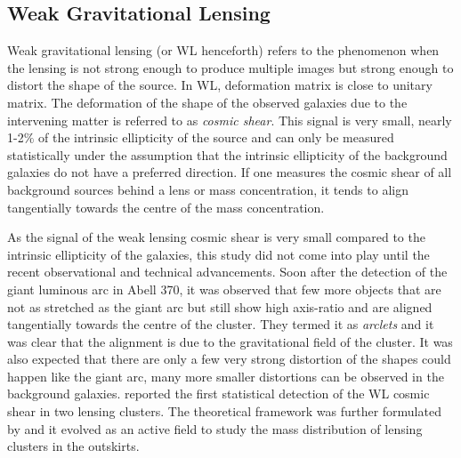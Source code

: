 \subsection{Weak Gravitational Lensing}\label{sec:wl}

Weak gravitational lensing (or WL henceforth) refers to the phenomenon when 
the lensing is not strong enough to produce multiple images but strong enough
to distort the shape of the source. In WL, deformation matrix is close
to unitary matrix.
The deformation of the shape of the observed galaxies
due to the intervening matter is referred to as {\it cosmic shear}. This
signal is very small, nearly 1-2$\%$ of the intrinsic ellipticity of the source 
and can only be measured statistically under the assumption that the intrinsic 
ellipticity of the background galaxies do not have a preferred direction. If one 
measures the cosmic shear of all background sources behind a lens or mass concentration,
it tends to align tangentially towards the centre of the mass concentration. 

As the signal of the weak lensing cosmic shear is very small compared to the 
intrinsic ellipticity of the galaxies, this study did not come into play until
the recent observational and technical advancements. Soon 
after the detection of the giant luminous arc in Abell 370, it was observed
that few more objects that are not as stretched as the giant arc but still show
high axis-ratio and are aligned tangentially towards the centre of the cluster. They
termed it as {\it arclets} and it was clear that the alignment is due to the 
gravitational field of the cluster. It was also expected that there are
only a few very strong distortion of the shapes could happen like the giant 
arc, many more smaller distortions can be observed in the background galaxies.
\cite{1990ApJ...349L...1T} reported the first statistical detection of the WL
cosmic shear in two lensing clusters. The theoretical framework was further
formulated by \cite{1993ApJ...404..441K} and it evolved as an active field
to study the mass distribution of lensing clusters in the outskirts. 

